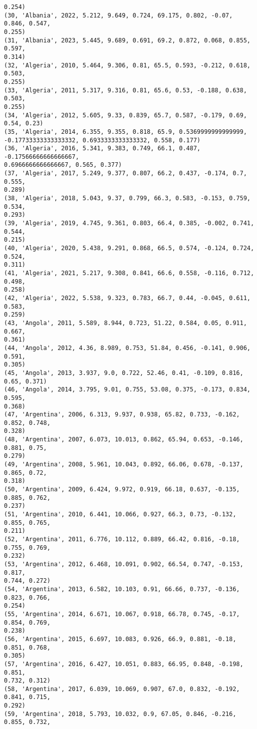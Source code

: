 \documentclass[11pt]{article}
\begin{document}
\begin{Verbatim}[commandchars=\\\{\}]
0.254)
(30, 'Albania', 2022, 5.212, 9.649, 0.724, 69.175, 0.802, -0.07, 0.846, 0.547,
0.255)
(31, 'Albania', 2023, 5.445, 9.689, 0.691, 69.2, 0.872, 0.068, 0.855, 0.597,
0.314)
(32, 'Algeria', 2010, 5.464, 9.306, 0.81, 65.5, 0.593, -0.212, 0.618, 0.503,
0.255)
(33, 'Algeria', 2011, 5.317, 9.316, 0.81, 65.6, 0.53, -0.188, 0.638, 0.503,
0.255)
(34, 'Algeria', 2012, 5.605, 9.33, 0.839, 65.7, 0.587, -0.179, 0.69, 0.54, 0.23)
(35, 'Algeria', 2014, 6.355, 9.355, 0.818, 65.9, 0.5369999999999999,
-0.17733333333333332, 0.6933333333333332, 0.558, 0.177)
(36, 'Algeria', 2016, 5.341, 9.383, 0.749, 66.1, 0.487, -0.17566666666666667,
0.6966666666666667, 0.565, 0.377)
(37, 'Algeria', 2017, 5.249, 9.377, 0.807, 66.2, 0.437, -0.174, 0.7, 0.555,
0.289)
(38, 'Algeria', 2018, 5.043, 9.37, 0.799, 66.3, 0.583, -0.153, 0.759, 0.534,
0.293)
(39, 'Algeria', 2019, 4.745, 9.361, 0.803, 66.4, 0.385, -0.002, 0.741, 0.544,
0.215)
(40, 'Algeria', 2020, 5.438, 9.291, 0.868, 66.5, 0.574, -0.124, 0.724, 0.524,
0.311)
(41, 'Algeria', 2021, 5.217, 9.308, 0.841, 66.6, 0.558, -0.116, 0.712, 0.498,
0.258)
(42, 'Algeria', 2022, 5.538, 9.323, 0.783, 66.7, 0.44, -0.045, 0.611, 0.583,
0.259)
(43, 'Angola', 2011, 5.589, 8.944, 0.723, 51.22, 0.584, 0.05, 0.911, 0.667,
0.361)
(44, 'Angola', 2012, 4.36, 8.989, 0.753, 51.84, 0.456, -0.141, 0.906, 0.591,
0.305)
(45, 'Angola', 2013, 3.937, 9.0, 0.722, 52.46, 0.41, -0.109, 0.816, 0.65, 0.371)
(46, 'Angola', 2014, 3.795, 9.01, 0.755, 53.08, 0.375, -0.173, 0.834, 0.595,
0.368)
(47, 'Argentina', 2006, 6.313, 9.937, 0.938, 65.82, 0.733, -0.162, 0.852, 0.748,
0.328)
(48, 'Argentina', 2007, 6.073, 10.013, 0.862, 65.94, 0.653, -0.146, 0.881, 0.75,
0.279)
(49, 'Argentina', 2008, 5.961, 10.043, 0.892, 66.06, 0.678, -0.137, 0.865, 0.72,
0.318)
(50, 'Argentina', 2009, 6.424, 9.972, 0.919, 66.18, 0.637, -0.135, 0.885, 0.762,
0.237)
(51, 'Argentina', 2010, 6.441, 10.066, 0.927, 66.3, 0.73, -0.132, 0.855, 0.765,
0.211)
(52, 'Argentina', 2011, 6.776, 10.112, 0.889, 66.42, 0.816, -0.18, 0.755, 0.769,
0.232)
(53, 'Argentina', 2012, 6.468, 10.091, 0.902, 66.54, 0.747, -0.153, 0.817,
0.744, 0.272)
(54, 'Argentina', 2013, 6.582, 10.103, 0.91, 66.66, 0.737, -0.136, 0.823, 0.766,
0.254)
(55, 'Argentina', 2014, 6.671, 10.067, 0.918, 66.78, 0.745, -0.17, 0.854, 0.769,
0.238)
(56, 'Argentina', 2015, 6.697, 10.083, 0.926, 66.9, 0.881, -0.18, 0.851, 0.768,
0.305)
(57, 'Argentina', 2016, 6.427, 10.051, 0.883, 66.95, 0.848, -0.198, 0.851,
0.732, 0.312)
(58, 'Argentina', 2017, 6.039, 10.069, 0.907, 67.0, 0.832, -0.192, 0.841, 0.715,
0.292)
(59, 'Argentina', 2018, 5.793, 10.032, 0.9, 67.05, 0.846, -0.216, 0.855, 0.732,

\end{Verbatim}
\end{document}
